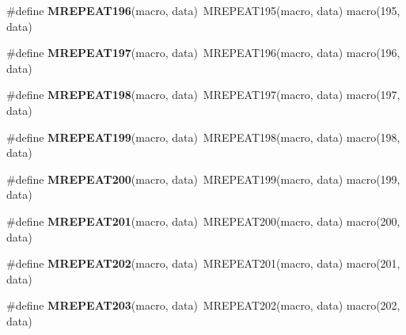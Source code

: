\begin{DoxyCompactItemize}
\item 
\hypertarget{group__group__sam0__utils__mrepeat_ga960fa8ced64817d70ae389a75693f351}{}\#define {\bfseries M\+R\+E\+P\+E\+A\+T196}(macro,  data)~M\+R\+E\+P\+E\+A\+T195(macro, data)   macro(195, data)\label{group__group__sam0__utils__mrepeat_ga960fa8ced64817d70ae389a75693f351}

\item 
\hypertarget{group__group__sam0__utils__mrepeat_ga8d5a1466ff85f6b12ce43dd9a5edf7e5}{}\#define {\bfseries M\+R\+E\+P\+E\+A\+T197}(macro,  data)~M\+R\+E\+P\+E\+A\+T196(macro, data)   macro(196, data)\label{group__group__sam0__utils__mrepeat_ga8d5a1466ff85f6b12ce43dd9a5edf7e5}

\item 
\hypertarget{group__group__sam0__utils__mrepeat_ga4061c0d7ba556ac993f2bcca14dd479c}{}\#define {\bfseries M\+R\+E\+P\+E\+A\+T198}(macro,  data)~M\+R\+E\+P\+E\+A\+T197(macro, data)   macro(197, data)\label{group__group__sam0__utils__mrepeat_ga4061c0d7ba556ac993f2bcca14dd479c}

\item 
\hypertarget{group__group__sam0__utils__mrepeat_gae89c87df1febe41c657bbbff536a77fa}{}\#define {\bfseries M\+R\+E\+P\+E\+A\+T199}(macro,  data)~M\+R\+E\+P\+E\+A\+T198(macro, data)   macro(198, data)\label{group__group__sam0__utils__mrepeat_gae89c87df1febe41c657bbbff536a77fa}

\item 
\hypertarget{group__group__sam0__utils__mrepeat_gad87de52b3036ad813d9f01fe6dc57d38}{}\#define {\bfseries M\+R\+E\+P\+E\+A\+T200}(macro,  data)~M\+R\+E\+P\+E\+A\+T199(macro, data)   macro(199, data)\label{group__group__sam0__utils__mrepeat_gad87de52b3036ad813d9f01fe6dc57d38}

\item 
\hypertarget{group__group__sam0__utils__mrepeat_gae15bf8ac240e5b8bb7d7fc73c7b58e41}{}\#define {\bfseries M\+R\+E\+P\+E\+A\+T201}(macro,  data)~M\+R\+E\+P\+E\+A\+T200(macro, data)   macro(200, data)\label{group__group__sam0__utils__mrepeat_gae15bf8ac240e5b8bb7d7fc73c7b58e41}

\item 
\hypertarget{group__group__sam0__utils__mrepeat_ga5a2a3af10439763667d2adee22e01fff}{}\#define {\bfseries M\+R\+E\+P\+E\+A\+T202}(macro,  data)~M\+R\+E\+P\+E\+A\+T201(macro, data)   macro(201, data)\label{group__group__sam0__utils__mrepeat_ga5a2a3af10439763667d2adee22e01fff}

\item 
\hypertarget{group__group__sam0__utils__mrepeat_ga017ff6b502ad948e0419894957597258}{}\#define {\bfseries M\+R\+E\+P\+E\+A\+T203}(macro,  data)~M\+R\+E\+P\+E\+A\+T202(macro, data)   macro(202, data)\label{group__group__sam0__utils__mrepeat_ga017ff6b502ad948e0419894957597258}


\end{DoxyCompactItemize}
